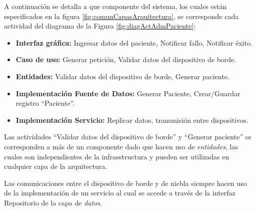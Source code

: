 A continuación se detalla a que componente del sistema, los cuales están especificados en la figura \ref{fig:comunCapasArquitectura}, se corresponde cada actividad del diagrama de la Figura \ref{fig:diagActAdmPaciente}:
\begin{itemize}
    \item \textbf{Interfaz gráfica:} Ingresar datos del paciente, Notificar fallo, Notificar éxito.
    \item \textbf{Caso de uso: }Generar petición, Validar datos del dispositivo de borde.
    \item \textbf{Entidades: }Validar datos del dispositivo de borde, Generar paciente.
    \item \textbf{Implementación Fuente de Datos: }Generar Paciente, Crear/Guardar registro ``Paciente''.
    \item \textbf{Implementación Servicio: }Replicar datos, transmisión entre dispositivos.
\end{itemize}

Las actividades ``Validar datos del dispositivo de borde'' y ``Generar paciente'' se corresponden a más de un componente dado que hacen uso de \textit{entidades}, las cuales son independientes de la infraestructura y pueden ser utilizadas en cualquier capa de la arquitectura.

Las comunicaciones entre el dispositivo de borde y de niebla siempre hacen uso de la implementación de un servicio al cual se accede a través de la interfaz Repositorio de la capa de \textit{datos}.


